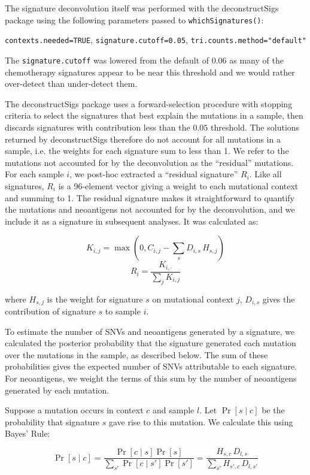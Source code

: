 The signature deconvolution itself was performed with the deconstructSigs\cite{Rosenthal_2016} package using the following parameters passed to \texttt{whichSignatures()}:

\texttt{contexts.needed=TRUE}, \texttt{signature.cutoff=0.05}, \texttt{tri.counts.method="default"}

The \texttt{signature.cutoff} was lowered from the default of $0.06$ as many of the chemotherapy signatures appear to be near this threshold and we would rather over-detect than under-detect them.

The deconstructSigs package uses a forward-selection procedure with stopping criteria to select the signatures that best explain the mutations in a sample, then discards signatures with contribution less than the $0.05$ threshold. The solutions returned by deconstructSigs therefore do not account for all mutations in a sample, i.e. the weights for each signature sum to less than 1. We refer to the mutations not accounted for by the deconvolution as the ``residual'' mutations. For each sample $i$, we post-hoc extracted a ``residual signature'' $R_i$. Like all signatures, $R_i$ is a 96-element vector giving a weight to each mutational context and summing to 1. The residual signature makes it straightforward to quantify the mutations and neoantigens not accounted for by the deconvolution, and we include it as a signature in subsequent analyses. It was calculated as:

\[ K_{i,j} = \max(0, C_{i,j} - \sum_s{D_{i,s} \, H_{s, j}}) \]
\[ R_i = \frac{K_{i, \cdot}}{\sum_j{K_{i,j}}} \]

where $H_{s,j}$ is the weight for signature $s$ on mutational context $j$, $D_{i,s}$ gives the contribution of signature $s$ to sample $i$.

To estimate the number of SNVs and neoantigens generated by a signature, we calculated the posterior probability that the signature generated each mutation over the mutations in the sample, as described below. The sum of these probabilities gives the expected number of SNVs attributable to each signature. For neoantigens, we weight the terms of this sum by the number of neoantigens generated by each mutation.

Suppose a mutation occurs in context $c$ and sample $l$. Let $\Pr[s \mid c]$ be the probability that signature $s$ gave rise to this mutation. We calculate this using Bayes' Rule:

\[
\Pr[s \mid c] = \frac{\Pr[c \mid s] \Pr[s]}{\sum_{s'}{\Pr[c \mid s']\Pr[s']}} = \frac{H_{s,c} \, D_{l,s}}{\sum_{s'}{H_{s',c} \, D_{l,s'}}}
\]
